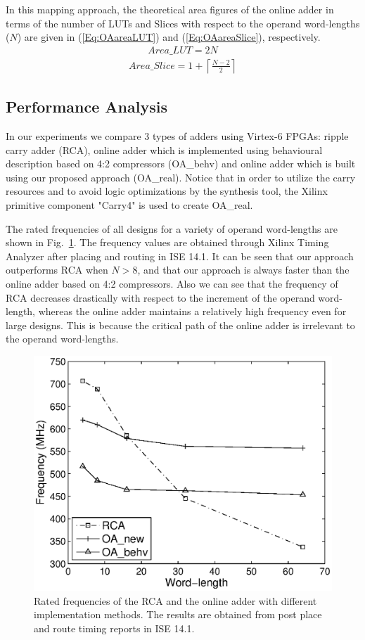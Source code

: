 \documentclass[conference]{IEEEtran}
\begin{document}
In this mapping approach, the theoretical area figures of the online adder in terms of the number of LUTs and Slices with respect to the operand word-lengths ($N$) are given in (\ref{Eq:OAareaLUT}) and (\ref{Eq:OAareaSlice}), respectively.
\begin{eqnarray}\label{Eq:OAareaLUT}
	Area\_LUT = 2N
\end{eqnarray}
%
\begin{eqnarray}\label{Eq:OAareaSlice}
	Area\_Slice = 1+\left\lceil\frac{N-2}{2}\right\rceil
\end{eqnarray}

\subsection{Performance Analysis}
In our experiments we compare 3 types of adders using Virtex-6 FPGAs: ripple carry adder (RCA), online adder which is implemented using behavioural description based on 4:2 compressors (OA\_behv) and online adder which is built using our proposed approach (OA\_real). Notice that in order to utilize the carry resources and to avoid logic optimizations by the synthesis tool, the Xilinx primitive component "Carry4" is used to create OA\_real.  

The rated frequencies of all designs for a variety of operand word-lengths are shown in Fig.~\ref{Fig:AdderFreq}. The frequency values are obtained through Xilinx Timing Analyzer after placing and routing in ISE 14.1. It can be seen that our approach outperforms RCA when $N>8$, and that our approach is always faster than the online adder based on 4:2 compressors. Also we can see that the frequency of RCA decreases drastically with respect to the increment of the operand word-length, whereas the online adder maintains a relatively high frequency even for large designs. This is because the critical path of the online adder is irrelevant to the operand word-lengths. 

\begin{figure}[tbp]
	\centering
	\includegraphics[width=.45\textwidth]{./Figures/Exp/Adder_Freq.eps}
	\caption{Rated frequencies of the RCA and the online adder with different implementation methods. The results are obtained from post place and route timing reports in ISE 14.1.}
	\label{Fig:AdderFreq}
\end{figure}
\end{document}
